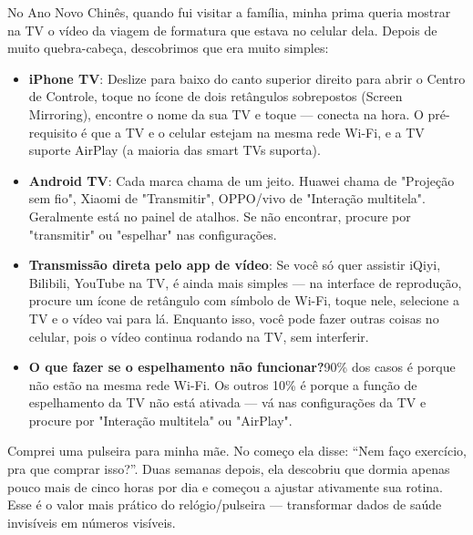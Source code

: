 No Ano Novo Chinês, quando fui visitar a família, minha prima queria mostrar na TV o vídeo da viagem de formatura que estava no celular dela. Depois de muito quebra-cabeça, descobrimos que era muito simples:

\begin{itemize}
  \item \textbf{iPhone TV}: Deslize para baixo do canto superior direito para abrir o Centro de Controle, toque no ícone de dois retângulos sobrepostos (Screen Mirroring), encontre o nome da sua TV e toque — conecta na hora. O pré-requisito é que a TV e o celular estejam na mesma rede Wi-Fi, e a TV suporte AirPlay (a maioria das smart TVs suporta).
  \item \textbf{Android TV}: Cada marca chama de um jeito. Huawei chama de "Projeção sem fio", Xiaomi de "Transmitir", OPPO/vivo de "Interação multitela". Geralmente está no painel de atalhos. Se não encontrar, procure por "transmitir" ou "espelhar" nas configurações.
  \item \textbf{Transmissão direta pelo app de vídeo}: Se você só quer assistir iQiyi, Bilibili, YouTube na TV, é ainda mais simples — na interface de reprodução, procure um ícone de retângulo com símbolo de Wi-Fi, toque nele, selecione a TV e o vídeo vai para lá. Enquanto isso, você pode fazer outras coisas no celular, pois o vídeo continua rodando na TV, sem interferir.
  \item \textbf{O que fazer se o espelhamento não funcionar?}90\% dos casos é porque não estão na mesma rede Wi-Fi. Os outros 10\% é porque a função de espelhamento da TV não está ativada — vá nas configurações da TV e procure por "Interação multitela" ou "AirPlay".
\end{itemize}


Comprei uma pulseira para minha mãe. No começo ela disse: “Nem faço exercício, pra que comprar isso?”. Duas semanas depois, ela descobriu que dormia apenas pouco mais de cinco horas por dia e começou a ajustar ativamente sua rotina. Esse é o valor mais prático do relógio/pulseira — transformar dados de saúde invisíveis em números visíveis.

